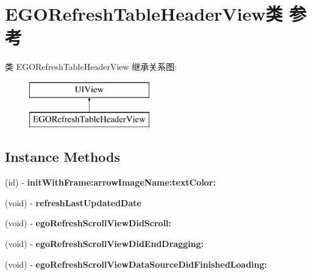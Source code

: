 \hypertarget{interface_e_g_o_refresh_table_header_view}{\section{E\-G\-O\-Refresh\-Table\-Header\-View类 参考}
\label{interface_e_g_o_refresh_table_header_view}
}
类 E\-G\-O\-Refresh\-Table\-Header\-View 继承关系图\-:\begin{figure}[H]
\begin{center}
\leavevmode
\includegraphics[height=2.000000cm]{interface_e_g_o_refresh_table_header_view}
\end{center}
\end{figure}
\subsection*{Instance Methods}
\begin{DoxyCompactItemize}
\item 
\hypertarget{interface_e_g_o_refresh_table_header_view_a629409b8affc67385b5857ba9f3968ec}{(id) -\/ {\bfseries init\-With\-Frame\-:arrow\-Image\-Name\-:text\-Color\-:}}\label{interface_e_g_o_refresh_table_header_view_a629409b8affc67385b5857ba9f3968ec}

\item 
\hypertarget{interface_e_g_o_refresh_table_header_view_a194cd65e46e4f0e1a87eed587ecbd5ce}{(void) -\/ {\bfseries refresh\-Last\-Updated\-Date}}\label{interface_e_g_o_refresh_table_header_view_a194cd65e46e4f0e1a87eed587ecbd5ce}

\item 
\hypertarget{interface_e_g_o_refresh_table_header_view_a8e555a74ee13195926251f84795e4e23}{(void) -\/ {\bfseries ego\-Refresh\-Scroll\-View\-Did\-Scroll\-:}}\label{interface_e_g_o_refresh_table_header_view_a8e555a74ee13195926251f84795e4e23}

\item 
\hypertarget{interface_e_g_o_refresh_table_header_view_a0f4a7b4d3a63a9d15156ce37295f8865}{(void) -\/ {\bfseries ego\-Refresh\-Scroll\-View\-Did\-End\-Dragging\-:}}\label{interface_e_g_o_refresh_table_header_view_a0f4a7b4d3a63a9d15156ce37295f8865}

\item 
\hypertarget{interface_e_g_o_refresh_table_header_view_a368b0e8d966a4b8613925ffce1b9eb8e}{(void) -\/ {\bfseries ego\-Refresh\-Scroll\-View\-Data\-Source\-Did\-Finished\-Loading\-:}}\label{interface_e_g_o_refresh_table_header_view_a368b0e8d966a4b8613925ffce1b9eb8e}

\end{DoxyCompactItemize}
